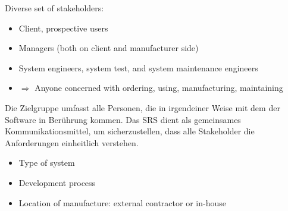 \begin{defBox}[title=Target group of SRS]
    Diverse set of stakeholders:
    \begin{itemize}
        \item Client, prospective users
        \item Managers (both on client and manufacturer side)
        \item System engineers, system test, and system maintenance engineers
        \item $\Rightarrow$ Anyone concerned with ordering, using, manufacturing, maintaining
    \end{itemize}
\end{defBox}
\begin{infoBox}
    Die Zielgruppe umfasst alle Personen, die in irgendeiner Weise mit dem  der Software in Berührung kommen. Das SRS dient als gemeinsames Kommunikationsmittel, um sicherzustellen, dass alle Stakeholder die Anforderungen einheitlich verstehen.
\end{infoBox}
\begin{defBox}[title=Level of detail depends on ...]
    \begin{itemize}
        \item Type of system
        \item Development process
        \item Location of manufacture: external contractor or in-house
    \end{itemize}
\end{defBox}
